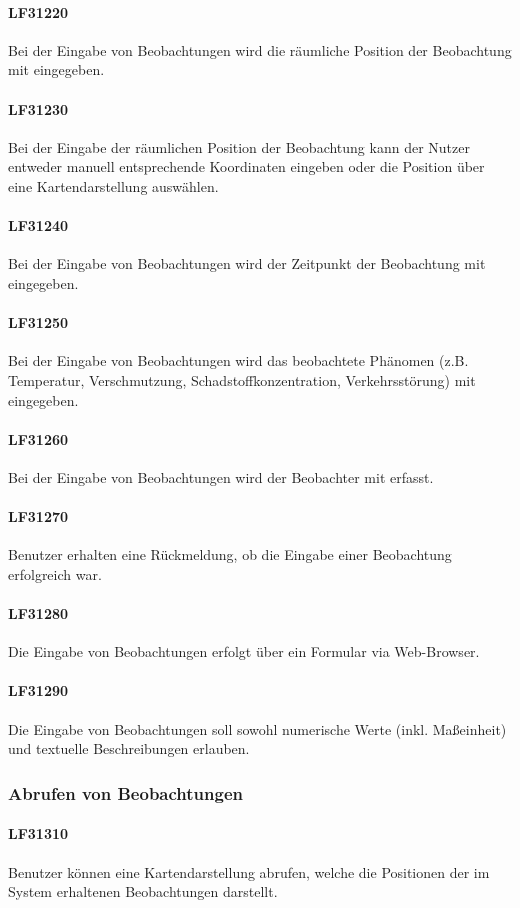 \documentclass[a4paper,11pt]{article}             %
\begin{document}
			\paragraph{LF31220}
				Bei der Eingabe von Beobachtungen wird die räumliche Position der Beobachtung mit eingegeben.		
			\paragraph{LF31230}
				Bei der Eingabe der räumlichen Position der Beobachtung kann der Nutzer entweder manuell entsprechende Koordinaten eingeben oder die Position über eine Kartendarstellung auswählen.		
			\paragraph{LF31240}
				Bei der Eingabe von Beobachtungen wird der Zeitpunkt der Beobachtung mit eingegeben.			
			\paragraph{LF31250}
				Bei der Eingabe von Beobachtungen wird das beobachtete Phänomen (z.B. Temperatur, Verschmutzung, Schadstoffkonzentration, Verkehrsstörung) mit eingegeben.
			\paragraph{LF31260}
				Bei der Eingabe von Beobachtungen wird der Beobachter mit erfasst.
			\paragraph{LF31270}
				Benutzer erhalten eine Rückmeldung, ob die Eingabe einer Beobachtung erfolgreich war.
			\paragraph{LF31280}
				Die Eingabe von Beobachtungen erfolgt über ein Formular via Web-Browser.
			\paragraph{LF31290}
				Die Eingabe von Beobachtungen soll sowohl numerische Werte (inkl. Maßeinheit) und textuelle Beschreibungen erlauben.
		\subsubsection{Abrufen von Beobachtungen}
			\paragraph{LF31310}
				Benutzer können eine Kartendarstellung abrufen, welche die Positionen der im System erhaltenen Beobachtungen darstellt.
\end{document}
